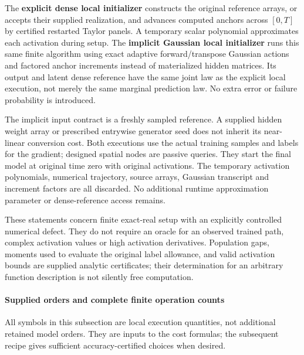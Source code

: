 
The \textbf{explicit dense local initializer} constructs the original reference arrays, or accepts their supplied realization, and advances computed anchors across \([0,\allowbreak T]\) by certified restarted Taylor panels. A temporary scalar polynomial approximates each activation during setup. The \textbf{implicit Gaussian local initializer} runs this same finite algorithm using exact adaptive forward/transpose Gaussian actions and factored anchor increments instead of materialized hidden matrices. Its output and latent dense reference have the same joint law as the explicit local execution, not merely the same marginal prediction law. No extra error or failure probability is introduced.



The implicit input contract is a freshly sampled reference. A supplied hidden weight array or prescribed entrywise generator seed does not inherit its near-linear conversion cost. Both executions use the actual training samples and labels for the gradient; designed spatial nodes are passive queries. They start the final model at original time zero with original activations. The temporary activation polynomials, numerical trajectory, source arrays, Gaussian transcript and increment factors are all discarded. No additional runtime approximation parameter or dense-reference access remains.



These statements concern finite exact-real setup with an explicitly controlled numerical defect. They do not require an oracle for an observed trained path, complex activation values or high activation derivatives. Population gaps, moments used to evaluate the original label allowance, and valid activation bounds are supplied analytic certificates; their determination for an arbitrary function description is not silently free computation.


\paragraph{Supplied orders and complete finite operation counts}
\label{int:harmonic-efficient-supplied-orders}
\mbox{}\par\smallskip


All symbols in this subsection are local execution quantities, not additional retained model orders. They are inputs to the cost formulas; the subsequent recipe gives sufficient accuracy-certified choices when desired.


